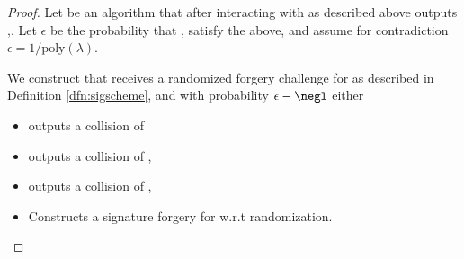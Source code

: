 \documentclass[11pt]{article}
\numberwithin{equation}{section} %
\numberwithin{figure}{section} %
\newcommand{\eps}{\ensuremath{\epsilon}\xspace}
\newcommand{\poly}{\ensuremath{\mathrm{poly}(\lambda)}\xspace}
\begin{document}
\begin{proof}
Let \adv be an algorithm that after interacting with \oracle as described above outputs \ledger,\tx.
Let \eps be the probability that \ledger, \tx satisfy the above, and assume for contradiction $\eps = 1/\poly$.

We construct \advprime that receives a randomized forgery challenge for \schnorr as described in Definition \ref{dfn:sigscheme},
and with probability $\eps-\negl$ either
\begin{itemize}
\item outputs a collision of \sighash
\item outputs a collision of \NF, 
 \item outputs a collision of \IVK, 
\item  Constructs a signature forgery for \schnorr w.r.t randomization.
\end{itemize}



\end{proof}
\end{document}
